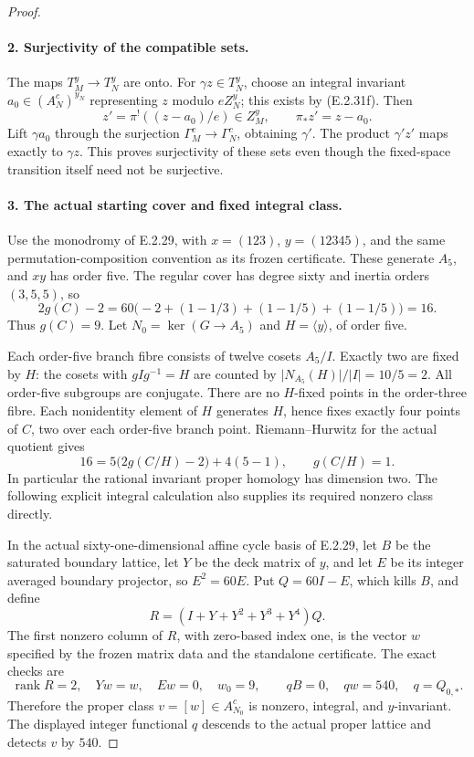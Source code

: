\begin{proof}
\paragraph{2. Surjectivity of the compatible sets.}
The maps \(T_M^y\to T_N^y\) are onto. For
\(\gamma z\in T_N^y\), choose an integral invariant
\(a_0\in(A_N^c)^{y_N}\) representing \(z\) modulo
\(eZ_N^y\); this exists by (E.2.31f). Then
\[
 z'=\pi^!((z-a_0)/e)\in Z_M^y,
 \qquad\pi_*z'=z-a_0.
\]
Lift \(\gamma a_0\) through the surjection
\(\Gamma_M^c\to\Gamma_N^c\), obtaining \(\gamma'\).
The product \(\gamma' z'\) maps exactly to \(\gamma z\).
This proves surjectivity of these sets even though the
fixed-space transition itself need not be surjective.

\paragraph{3. The actual starting cover and fixed integral class.}
Use the monodromy of E.2.29, with \(x=(123)\),
\(y=(12345)\), and the same permutation-composition
convention as its frozen certificate. These generate
\(A_5\), and \(xy\) has order five. The regular cover
has degree sixty and inertia orders \((3,5,5)\), so
\[
 2g(C)-2
  =60\bigl(-2+(1-1/3)+(1-1/5)+(1-1/5)\bigr)=16.
\]
Thus \(g(C)=9\). Let \(N_0=\ker(G\to A_5)\) and
\(H=\langle y\rangle\), of order five.

Each order-five branch fibre consists of twelve cosets
\(A_5/I\). Exactly two are fixed by \(H\): the cosets
with \(gIg^{-1}=H\) are counted by
\(\lvert N_{A_5}(H)\rvert/\lvert I\rvert=10/5=2\).
All order-five subgroups are conjugate. There are no
\(H\)-fixed points in the order-three fibre. Each
nonidentity element of \(H\) generates \(H\), hence
fixes exactly four points of \(C\), two over each
order-five branch point. Riemann--Hurwitz for the actual
quotient gives
\[
 16=5\bigl(2g(C/H)-2\bigr)+4(5-1),
 \qquad g(C/H)=1.
\tag{E.2.31h}
\]
In particular the rational invariant proper homology has
dimension two. The following explicit integral calculation
also supplies its required nonzero class directly.

In the actual sixty-one-dimensional affine cycle basis of
E.2.29, let \(B\) be the saturated boundary lattice, let
\(Y\) be the deck matrix of \(y\), and let \(E\) be its
integer averaged boundary projector, so \(E^2=60E\).
Put \(Q=60I-E\), which kills \(B\), and define
\[
 R=(I+Y+Y^2+Y^3+Y^4)Q.
\tag{E.2.31i}
\]
The first nonzero column of \(R\), with zero-based index
one, is the vector \(w\) specified by the frozen matrix
data and the standalone certificate. The exact checks are
\[
 \operatorname{rank}R=2,\quad Yw=w,\quad Ew=0,\quad
 w_0=9,\qquad qB=0,\quad qw=540,
 \quad q=Q_{0,*}.
\tag{E.2.31j}
\]
Therefore the proper class \(v=[w]\in A_{N_0}^c\) is
nonzero, integral, and \(y\)-invariant. The displayed
integer functional \(q\) descends to the actual proper
lattice and detects \(v\) by \(540\).


\end{proof}
